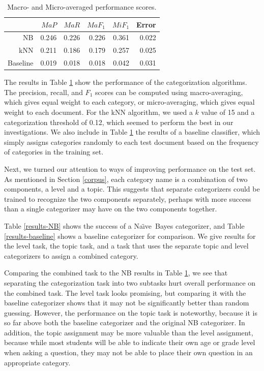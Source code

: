 \documentclass[twocolumn]{article}
\newcommand{\naive}{Na\"\i ve}
\begin{document}
\begin{table}
\begin{tabular}{|r|r|r|r|r|r|}
\hline
         & $MaP$   & $MaR$   & $MaF_1$ & $MiF_1$ & Error \\ \hline
NB       & 0.246   & 0.226   & 0.226   & 0.361   & 0.022 \\ \hline
kNN      & 0.211   & 0.186   & 0.179   & 0.257   & 0.025 \\ \hline
Baseline & 0.019   & 0.018   & 0.018   & 0.042   & 0.031 \\ \hline
\end{tabular}
\caption{Macro- and Micro-averaged performance scores.}
\label{results-main}
\end{table}


The results in Table \ref{results-main} show the performance of the
categorization algorithms.  The precision, recall, and $F_1$ scores
can be computed using macro-averaging, which gives equal weight to
each category, or micro-averaging, which gives equal weight to each
document. \cite{yang:99, sebastiani:02} For the kNN algorithm, we used
a $k$ value of 15 and a categorization threshold of 0.12, which seemed
to perform the best in our investigations.  We also include in Table
\ref{results-main} the results of a baseline classifier, which simply
assigns categories randomly to each test document based on the
frequency of categories in the training set.

Next, we turned our attention to ways of improving performance on the
test set.  As mentioned in Section \ref{corpus}, each category name is
a combination of two components, a level and a topic.  This suggests
that separate categorizers could be trained to recognize the two
components separately, perhaps with more success than a single
categorizer may have on the two components together.

Table \ref{results-NB} shows the success of a \naive\ Bayes
categorizer, and Table \ref{results-baseline} shows a baseline
categorizer for comparison.  We give results for the level task, the
topic task, and a task that uses the separate topic and level
categorizers to assign a combined category.

Comparing the combined task to the NB results in Table
\ref{results-main}, we see that separating the categorization task
into two subtasks hurt overall performance on the combined task.  The
level task looks promising, but comparing it with the baseline
categorizer shows that it may not be significantly better than random
guessing.  However, the performance on the topic task is noteworthy,
because it is so far above both the baseline categorizer and the
original NB categorizer.  In addition, the topic assignment may be
more valuable than the level assignment, because while most students
will be able to indicate their own age or grade level when asking a
question, they may not be able to place their own question in an
appropriate category.
\end{document}
